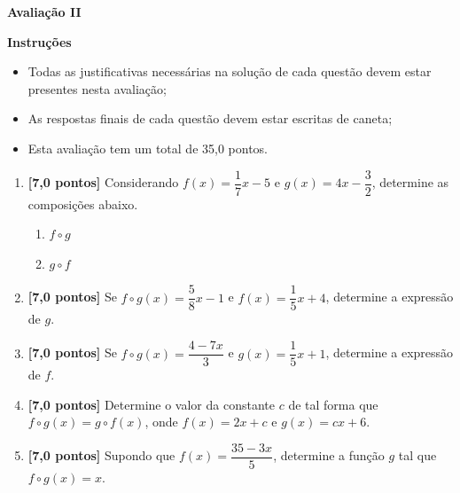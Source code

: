 \documentclass[12pt,a4paper]{article}
\begin{document}
\begin{center}
 \textbf{Avaliação II}
\end{center}

\textbf{Instruções}
\begin{itemize}
 \item Todas as justificativas necessárias na solução de cada questão devem estar presentes nesta avaliação;
 \item As respostas finais de cada questão devem estar escritas de caneta;
 \item Esta avaliação tem um total de 35,0 pontos.
\end{itemize}

\begin{enumerate}
    \item \textbf{[7,0 pontos]} Considerando $f(x) = \dfrac{1}{7}x - 5$ e $g(x) = 4x - \dfrac{3}{2}$, determine as composições
    abaixo.
    \begin{enumerate}
      \item $f\circ g$
      \item $g\circ f$
    \end{enumerate}

    \item \textbf{[7,0 pontos]} Se $f\circ g(x) = \dfrac{5}{8}x - 1$ e $f(x) = \dfrac{1}{5}x + 4$,
    determine a expressão de $g$.
  
    \item \textbf{[7,0 pontos]} Se $f\circ g(x) = \dfrac{4 - 7x}{3}$ e $g(x) = \dfrac{1}{5}x + 1$,
    determine a expressão de $f$.

    \item \textbf{[7,0 pontos]} Determine o valor da constante $c$ de tal forma que
    $f\circ g(x) = g\circ f(x)$, onde $f(x) = 2x + c$ e 
    $g(x) = cx + 6$.

    \item \textbf{[7,0 pontos]} Supondo que $f(x) = \dfrac{35 - 3x}{5}$, determine a função
  $g$ tal que $f\circ g(x) = x$.

\end{enumerate}
\end{document}
